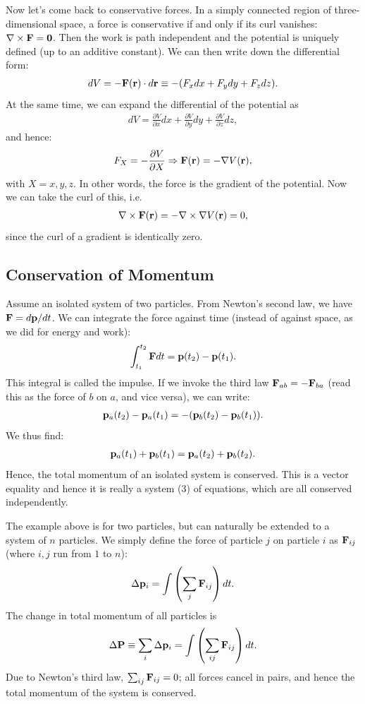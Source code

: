 \documentclass[12pt]{article}
\newcommand{\be}{\begin{eqnarray}}
\newcommand{\ee}{\end{eqnarray}}
\begin{document}
Now let's come back to conservative forces. In a simply connected region of three-dimensional space, a force is conservative if and only if its curl vanishes: $\nabla \times {\bf F}={\bf 0}$. Then the work is path independent and the potential is uniquely defined (up to an additive constant). We can then write down the differential form:
\be
dV = -{\bf F}({\bf r}) \cdot d{\bf r} \equiv - (F_x dx + F_y dy + F_z dz).
\ee
At the same time, we can expand the differential of the potential as 
\be
dV = \frac{\partial V}{\partial x} dx + \frac{\partial V}{\partial y} dy + \frac{\partial V}{\partial z} dz,
\ee
and hence:
\be
F_X=- \frac{\partial V}{\partial X} \Rightarrow {\bf F}({\bf r}) = - \nabla V({\bf r}),
\ee
with $X = x,y,z$. In other words, the force is the gradient of the potential. Now we can take the curl of this, i.e. 
\be
\nabla \times {\bf F}({\bf r}) = -\nabla \times \nabla V({\bf r}) = 0,
\ee
since the curl of a gradient is identically zero.

\subsection{Conservation of Momentum}
Assume an isolated system of two particles. From Newton's second law, we have ${\bf F} = d{\bf p}/dt$. We can integrate the force against time (instead of against space, as we did for energy and work):
\be
\int_{t_1}^{t_2} {\bf F} dt = {\bf p}(t_2)-{\bf p}(t_1).  
\ee
This integral is called the impulse. If we invoke the third law ${\bf F}_{ab}=-{\bf F}_{ba}$ (read this as the force of $b$ on $a$, and vice versa), we can write:
\be
{\bf p}_a(t_2)-{\bf p}_a(t_1) = - ({\bf p}_b(t_2)-{\bf p}_b(t_1)). 
\ee
We thus find:
\be
{\bf p}_a(t_1)+{\bf p}_b(t_1) = {\bf p}_a(t_2)+{\bf p}_b(t_2). 
\ee
Hence, the total momentum of an isolated system is conserved. This is a vector equality and hence it is really a system (3) of equations, which are all conserved independently. 

The example above is for two particles, but can naturally be extended to a system of $n$ particles. We simply define the force of particle $j$ on particle $i$ as ${\bf F}_{ij}$ (where $i,j$ run from $1$ to $n$): 
\be
\Delta {\bf p}_i = \int \left(\sum_j {\bf F}_{ij}\right) dt.
\ee
The change in total momentum of all particles is 
\be
\Delta {\bf P} \equiv \sum_i \Delta {\bf p}_i = \int \left(\sum_{ij} {\bf F}_{ij}\right) dt. 
\ee
Due to Newton's third law, $\sum_{ij} {\bf F}_{ij} = 0$; all forces cancel in pairs, and hence the total momentum of the system is conserved. 
\end{document}
